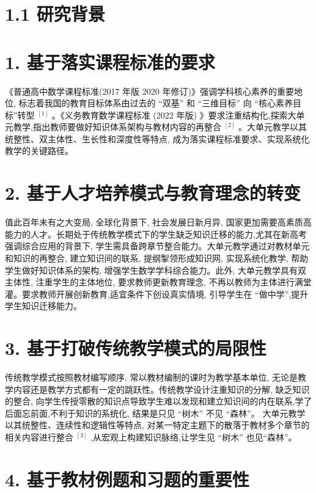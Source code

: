 \documentclass[10pt]{article}
\begin{document}
\section*{1.1 研究背景}

\section*{1. 基于落实课程标准的要求}

《普通高中数学课程标准(2017 年版 2020 年修订)》强调学科核心素养的重要地位, 标志着我国的教育目标体系由过去的 “双基” 和 “三维目标” 向 “核心素养目标”转型 \({}^{\left\lbrack  1\right\rbrack  }\) 。《义务教育数学课程标准 (2022 年版) 》要求注重结构化,探索大单元教学,指出教师要做好知识体系架构与教材内容的再整合 \({}^{\left\lbrack  2\right\rbrack  }\) 。大单元教学以其统整性、双主体性、生长性和深度性等特点, 成为落实课程标准要求、实现系统化教学的关键路径。

\section*{2. 基于人才培养模式与教育理念的转变}

值此百年未有之大变局, 全球化背景下, 社会发展日新月异, 国家更加需要高素质高能力的人才。长期处于传统教学模式下的学生缺乏知识迁移的能力,尤其在新高考强调综合应用的背景下, 学生需具备跨章节整合能力。大单元教学通过对教材单元和知识的再整合, 建立知识间的联系, 提纲掣领形成知识网, 实现系统化教学, 帮助学生做好知识体系的架构, 增强学生数学学科综合能力。此外, 大单元教学具有双主体性, 注重学生的主体地位, 要求教师更新教育理念, 不再以教师为主体进行满堂灌。要求教师开展创新教育,适宜条件下创设真实情境, 引导学生在 “做中学”,提升学生知识迁移能力。

\section*{3. 基于打破传统教学模式的局限性}

传统教学模式按照教材编写顺序, 常以教材编制的课时为教学基本单位, 无论是教学内容还是教学方式都有一定的跳跃性。传统教学设计注重知识的分解, 缺乏知识的整合, 向学生传授零散的知识点导致学生难以发现和建立知识间的内在联系,学了后面忘前面,不利于知识的系统化, 结果是只见 “树木” 不见 “森林”。 大单元教学以其统整性、连续性和逻辑性等特点, 对某一特定主题下的散落于教材多个章节的相关内容进行整合 \({}^{\left\lbrack  3\right\rbrack  }\) ,从宏观上构建知识脉络,让学生见 “树木” 也见“森林”。

\section*{4. 基于教材例题和习题的重要性}
\end{document}
